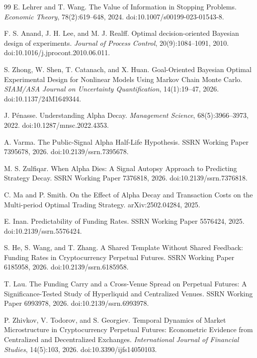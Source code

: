 \documentclass[11pt]{article}
\numberwithin{equation}{section}
\theoremstyle{plain}
\theoremstyle{definition}
\theoremstyle{remark}
\begin{document}
\begin{thebibliography}{99}
E. Lehrer and T. Wang.
\newblock The Value of Information in Stopping Problems.
\newblock \emph{Economic Theory}, 78(2):619--648, 2024.
\newblock doi:10.1007/s00199-023-01543-8.

F. S. Anand, J. H. Lee, and M. J. Realff.
\newblock Optimal decision-oriented Bayesian design of experiments.
\newblock \emph{Journal of Process Control}, 20(9):1084--1091, 2010.
\newblock doi:10.1016/j.jprocont.2010.06.011.

S. Zhong, W. Shen, T. Catanach, and X. Huan.
\newblock Goal-Oriented Bayesian Optimal Experimental Design for Nonlinear Models Using Markov Chain Monte Carlo.
\newblock \emph{SIAM/ASA Journal on Uncertainty Quantification}, 14(1):19--47, 2026.
\newblock doi:10.1137/24M1649344.

J. P\'enasse.
\newblock Understanding Alpha Decay.
\newblock \emph{Management Science}, 68(5):3966--3973, 2022.
\newblock doi:10.1287/mnsc.2022.4353.

A. Varma.
\newblock The Public-Signal Alpha Half-Life Hypothesis.
\newblock SSRN Working Paper 7395678, 2026.
\newblock doi:10.2139/ssrn.7395678.

M. S. Zulfiqar.
\newblock When Alpha Dies: A Signal Autopsy Approach to Predicting Strategy Decay.
\newblock SSRN Working Paper 7376818, 2026.
\newblock doi:10.2139/ssrn.7376818.

C. Ma and P. Smith.
\newblock On the Effect of Alpha Decay and Transaction Costs on the Multi-period Optimal Trading Strategy.
\newblock arXiv:2502.04284, 2025.

E. Inan.
\newblock Predictability of Funding Rates.
\newblock SSRN Working Paper 5576424, 2025.
\newblock doi:10.2139/ssrn.5576424.

S. He, S. Wang, and T. Zhang.
\newblock A Shared Template Without Shared Feedback: Funding Rates in Cryptocurrency Perpetual Futures.
\newblock SSRN Working Paper 6185958, 2026.
\newblock doi:10.2139/ssrn.6185958.

T. Lau.
\newblock The Funding Carry and a Cross-Venue Spread on Perpetual Futures: A Significance-Tested Study of Hyperliquid and Centralized Venues.
\newblock SSRN Working Paper 6993978, 2026.
\newblock doi:10.2139/ssrn.6993978.

P. Zhivkov, V. Todorov, and S. Georgiev.
\newblock Temporal Dynamics of Market Microstructure in Cryptocurrency Perpetual Futures: Econometric Evidence from Centralized and Decentralized Exchanges.
\newblock \emph{International Journal of Financial Studies}, 14(5):103, 2026.
\newblock doi:10.3390/ijfs14050103.


\end{thebibliography}
\end{document}

